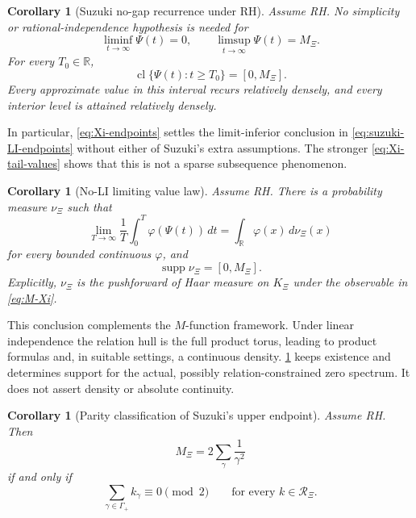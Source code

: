 \documentclass[11pt]{article}
\newtheorem{corollary}[theorem]{Corollary}
\theoremstyle{remark}
\newcommand{\R}{\mathbb R}
\newcommand{\supp}{\operatorname{supp}}
\newcommand{\cl}{\operatorname{cl}}
\newcommand{\Rel}{\mathcal R}
\begin{document}
\begin{corollary}[Suzuki no-gap recurrence under RH]\label{cor:Suzuki-recurrence}
Assume RH.  No simplicity or rational-independence hypothesis is needed for
\begin{equation}\label{eq:Xi-endpoints}
 \liminf_{t\to\infty}\Psi(t)=0,
 \qquad
 \limsup_{t\to\infty}\Psi(t)=M_\Xi.
\end{equation}
For every $T_0\in\R$,
\begin{equation}\label{eq:Xi-tail-values}
 \cl\{\Psi(t):t\geq T_0\}=[0,M_\Xi].
\end{equation}
Every approximate value in this interval recurs relatively densely, and every interior level is
attained relatively densely.
\end{corollary}

In particular, \eqref{eq:Xi-endpoints} settles the limit-inferior conclusion in
\eqref{eq:suzuki-LI-endpoints} without either of Suzuki's extra assumptions.  The stronger
\eqref{eq:Xi-tail-values} shows that this is not a sparse subsequence phenomenon.

\begin{corollary}[No-LI limiting value law]\label{cor:Suzuki-Haar}
Assume RH.  There is a probability measure $\nu_\Xi$ such that
\begin{equation}\label{eq:Xi-value-law}
 \lim_{T\to\infty}\frac1T\int_0^T\varphi(\Psi(t))\,dt
 =\int_\R\varphi(x)\,d\nu_\Xi(x)
\end{equation}
for every bounded continuous $\varphi$, and
\begin{equation}\label{eq:Xi-measure-support}
 \supp\nu_\Xi=[0,M_\Xi].
\end{equation}
Explicitly, $\nu_\Xi$ is the pushforward of Haar measure on $K_\Xi$ under the observable in
\eqref{eq:M-Xi}.
\end{corollary}

This conclusion complements the $M$-function framework.  Under linear independence the relation
hull is the full product torus, leading to product formulas and, in suitable settings, a continuous
density.  \cref{cor:Suzuki-Haar} keeps existence and determines support for the actual, possibly
relation-constrained zero spectrum.  It does not assert density or absolute continuity.

\begin{corollary}[Parity classification of Suzuki's upper endpoint]\label{cor:Xi-parity}
Assume RH.  Then
\begin{equation}\label{eq:Xi-absolute-ceiling}
 M_\Xi=2\sum_{\gamma}\frac1{\gamma^2}
\end{equation}
if and only if
\begin{equation}\label{eq:Xi-even-relations}
 \sum_{\gamma\in\Gamma_+}k_\gamma\equiv0\pmod2
 \qquad\text{for every }k\in\Rel_\Xi.
\end{equation}
\end{corollary}
\end{document}
